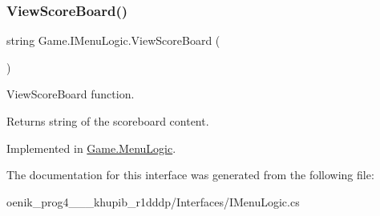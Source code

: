 \subsubsection{\texorpdfstring{ViewScoreBoard()}{ViewScoreBoard()}}
{\footnotesize\ttfamily string Game.\+I\+Menu\+Logic.\+View\+Score\+Board (\begin{DoxyParamCaption}{ }\end{DoxyParamCaption})}



View\+Score\+Board function. 

\begin{DoxyReturn}{Returns}
string of the scoreboard content.
\end{DoxyReturn}


Implemented in \mbox{\hyperlink{class_game_1_1_menu_logic_a1dd2dae3ed7ea7bb1c156cb5e480cb02}{Game.\+Menu\+Logic}}.



The documentation for this interface was generated from the following file\+:\begin{DoxyCompactItemize}
\item 
oenik\+\_\+prog4\+\_\+\_\+\_\+khupib\+\_\+r1dddp/\+Interfaces/I\+Menu\+Logic.\+cs\end{DoxyCompactItemize}
